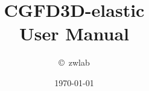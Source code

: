 \documentclass[oneside,english]{book}
\begin{document}


\title{\textbf{CGFD3D-elastic}\\
       \textbf{User Manual}}
 

\author{\copyright \, zwlab}

\date{\today}

\maketitle


\newpage{}



\newpage

\tableofcontents


%











\appendix

%

\end{document}

